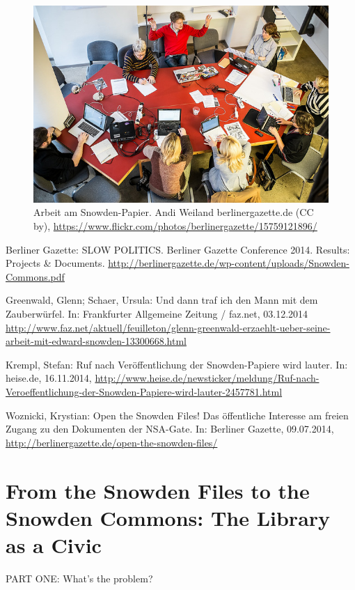 \documentclass[a4paper,
fontsize=11pt,
oneside,
numbers=noperiodatend,
parskip=half-,
bibliography=totoc,
final
]{scrartcl}
\begin{document}
\begin{figure}[htbp]
\centering
\includegraphics{flickr.jpg}
\caption{Arbeit am Snowden-Papier. Andi Weiland \textbar{}
berlinergazette.de (CC by),
\url{https://www.flickr.com/photos/berlinergazette/15759121896/}}
\end{figure}

Berliner Gazette: SLOW POLITICS. Berliner Gazette Conference 2014.
Results: Projects \& Documents.
\url{http://berlinergazette.de/wp-content/uploads/Snowden-Commons.pdf}

Greenwald, Glenn; Schaer, Ursula: Und dann traf ich den Mann mit dem
Zauberwürfel. In: Frankfurter Allgemeine Zeitung / faz.net, 03.12.2014
\url{http://www.faz.net/aktuell/feuilleton/glenn-greenwald-erzaehlt-ueber-seine-arbeit-mit-edward-snowden-13300668.html}

Krempl, Stefan: Ruf nach Veröffentlichung der Snowden-Papiere wird
lauter. In: heise.de, 16.11.2014,
\url{http://www.heise.de/newsticker/meldung/Ruf-nach-Veroeffentlichung-der-Snowden-Papiere-wird-lauter-2457781.html}

Woznicki, Krystian: Open the Snowden Files! Das öffentliche Interesse am
freien Zugang zu den Dokumenten der NSA-Gate. In: Berliner Gazette,
09.07.2014, \url{http://berlinergazette.de/open-the-snowden-files/}

\section*{From the Snowden Files to the Snowden Commons: The
Library as a
Civic}\label{from-the-snowden-files-to-the-snowden-commons-the-library-as-a-civic}

PART ONE: What's the problem?
\end{document}
